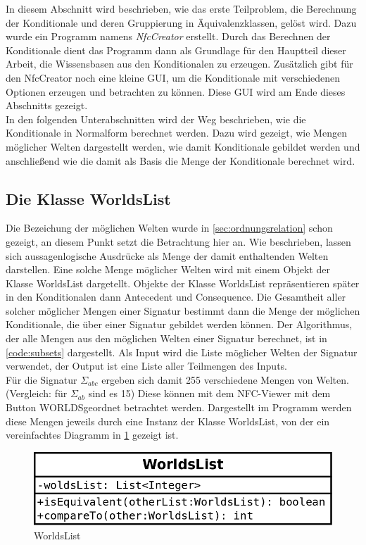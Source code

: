 \documentclass[12pt,a4paper]{article}
\begin{document}
In diesem Abschnitt wird beschrieben, wie das erste Teilproblem, die Berechnung der Konditionale und deren Gruppierung in Äquivalenzklassen, gelöst wird. Dazu wurde ein Programm namens \textit{NfcCreator} erstellt. Durch das Berechnen der Konditionale dient das Programm dann als Grundlage für den Hauptteil dieser Arbeit, die Wissensbasen aus den Konditionalen zu erzeugen. Zusätzlich gibt für den NfcCreator noch eine kleine GUI, um die Konditionale mit verschiedenen Optionen erzeugen und betrachten zu können. Diese GUI wird am Ende dieses Abschnitts gezeigt. \\
In den folgenden Unterabschnitten wird der Weg beschrieben, wie die Konditionale in Normalform berechnet werden. Dazu wird gezeigt, wie Mengen möglicher Welten dargestellt werden, wie damit Konditionale gebildet werden und anschließend wie die damit als Basis die Menge der Konditionale berechnet wird.



\subsection{Die Klasse WorldsList}
\label{sec:worldslist}
Die Bezeichung der möglichen Welten wurde in \autoref{sec:ordnungsrelation} schon gezeigt, an diesem Punkt setzt die Betrachtung hier an. Wie beschrieben, lassen sich aussagenlogische Ausdrücke als Menge der damit enthaltenden Welten darstellen. Eine solche Menge möglicher Welten wird mit einem Objekt der Klasse WorldsList dargetellt. Objekte der Klasse WorldsList repräsentieren später in den Konditionalen dann Antecedent und Consequence. Die Gesamtheit aller solcher möglicher Mengen einer Signatur bestimmt dann die Menge der möglichen Konditionale, die über einer Signatur gebildet werden können. Der Algorithmus, der alle Mengen aus den möglichen Welten einer Signatur berechnet, ist in \autoref{code:subsets} dargestellt. Als Input wird die Liste möglicher Welten der Signatur verwendet, der Output ist eine Liste aller Teilmengen des Inputs. \\
Für die Signatur $\Sigma_{abc}$ ergeben sich damit 255 verschiedene Mengen von Welten. (Vergleich: für $\Sigma_{ab}$ sind es 15) Diese können mit dem NFC-Viewer mit dem Button \glqq WORLDS\grqq \space geordnet betrachtet werden. Dargestellt im Programm werden diese Mengen jeweils durch eine Instanz der Klasse WorldsList, von der ein vereinfachtes Diagramm in \ref{pic:worldslist} gezeigt ist. 


\begin{figure}
\includegraphics[width=0.45\linewidth]{bilder/worldslist.png}
\caption{WorldsList}
\label{pic:worldslist}
\end{figure}
\end{document}
